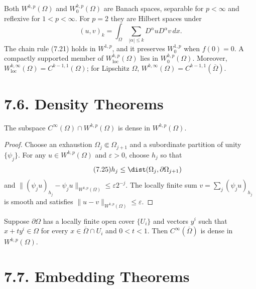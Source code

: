 Both $W^{k,p}(\Omega)$ and $W_0^{k,p}(\Omega)$ are Banach spaces, separable
for $p<\infty$ and reflexive for $1<p<\infty$. For $p=2$ they are Hilbert
spaces under
\begin{equation}
\tag{7.24}
(u,v)_k=\int_\Omega\sum_{|\alpha|\leq k}D^\alpha uD^\alpha v\,dx.
\end{equation}
The chain rule (7.21) holds in $W^{1,p}$, and it preserves $W_0^{1,p}$ when
$f(0)=0$. A compactly supported member of $W^{k,p}_{\mathrm{loc}}(\Omega)$
lies in $W_0^{k,p}(\Omega)$. Moreover,
$W^{k,\infty}_{\mathrm{loc}}(\Omega)=C^{k-1,1}(\Omega)$; for Lipschitz
$\Omega$, $W^{k,\infty}(\Omega)=C^{k-1,1}(\overline\Omega)$.

\section*{7.6. Density Theorems}

\begin{theorem}
\label{gt:thm-sobolev-density-smooth}
The subspace $C^\infty(\Omega)\cap W^{k,p}(\Omega)$ is dense in
$W^{k,p}(\Omega)$.
\end{theorem}
\begin{proof}
\sketch Choose an exhaustion $\Omega_j\Subset\Omega_{j+1}$ and a subordinate
partition of unity $\{\psi_j\}$. For any $u\in W^{k,p}(\Omega)$ and
$\varepsilon>0$, choose $h_j$ so that
\begin{equation}
\tag{7.25}
h_j\leq\dist(\Omega_j,\partial\Omega_{j+1})
\end{equation}
and
$\|(\psi_ju)_{h_j}-\psi_ju\|_{W^{k,p}(\Omega)}\leq\varepsilon 2^{-j}$.
The locally finite sum $v=\sum_j(\psi_ju)_{h_j}$ is smooth and satisfies
$\|u-v\|_{W^{k,p}(\Omega)}\leq\varepsilon$.
\end{proof}

\begin{proposition}
\label{gt:prop-sobolev-segment-density}
Suppose $\partial\Omega$ has a locally finite open cover $\{U_i\}$ and vectors
$y^i$ such that $x+ty^i\in\Omega$ for every
$x\in\overline\Omega\cap U_i$ and $0<t<1$. Then
$C^\infty(\overline\Omega)$ is dense in $W^{k,p}(\Omega)$.
\end{proposition}

\section*{7.7. Embedding Theorems}

